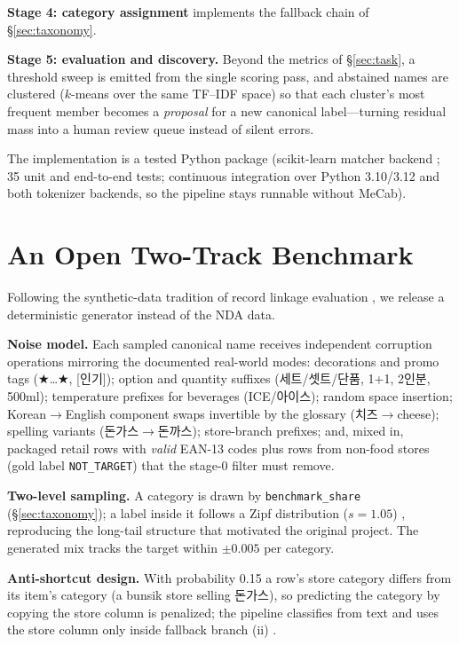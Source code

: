 \documentclass[10pt,twocolumn]{article}
\begin{document}
\textbf{Stage 4: category assignment} implements the fallback chain of
\S\ref{sec:taxonomy}.

\textbf{Stage 5: evaluation and discovery.} Beyond the metrics of
\S\ref{sec:task}, a threshold sweep is emitted from the single scoring pass,
and abstained names are clustered ($k$-means \cite{lloyd1982} over the same
TF--IDF space) so that each cluster's most frequent member becomes a
\emph{proposal} for a new canonical label---turning residual mass into a
human review queue instead of silent errors.

The implementation is a tested Python package (scikit-learn matcher backend
\cite{pedregosa2011}; 35 unit and end-to-end tests; continuous integration
over Python 3.10/3.12 and both tokenizer backends, so the pipeline stays
runnable without MeCab).

\section{An Open Two-Track Benchmark}
\label{sec:benchmark}

Following the synthetic-data tradition of record linkage evaluation
\cite{christen2005}, we release a deterministic generator instead of the NDA
data.

\textbf{Noise model.} Each sampled canonical name receives independent
corruption operations mirroring the documented real-world modes:
decorations and promo tags (\mbox{★}{\dots}\mbox{★}, [인기]); option and
quantity suffixes (세트/셋트/단품, \mbox{1+1}, \mbox{2인분},
\mbox{500ml}); temperature prefixes for beverages (ICE/아이스); random
space insertion; Korean$\rightarrow$English component swaps invertible by
the glossary (치즈$\rightarrow$cheese); spelling variants
(돈가스$\rightarrow$돈까스); store-branch prefixes; and, mixed in, packaged
retail rows with \emph{valid} EAN-13 codes plus rows from non-food stores
(gold label \texttt{NOT\_TARGET}) that the stage-0 filter must remove.

\textbf{Two-level sampling.} A category is drawn by
\texttt{benchmark\_share} (\S\ref{sec:taxonomy}); a label inside it follows
a Zipf distribution ($s{=}1.05$) \cite{zipf1949}, reproducing the long-tail
structure that motivated the original project. The generated mix tracks the
target within $\pm 0.005$ per category.

\textbf{Anti-shortcut design.} With probability 0.15 a row's store category
differs from its item's category (a bunsik store selling 돈가스), so
predicting the category by copying the store column is penalized; the
pipeline classifies from text and uses the store column only inside fallback
branch (ii) \cite{geirhos2020}.
\end{document}
